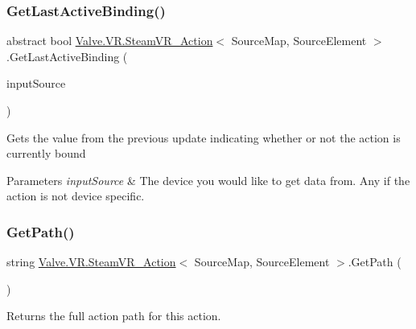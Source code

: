\subsubsection{\texorpdfstring{GetLastActiveBinding()}{GetLastActiveBinding()}\hspace{0.1cm}{\footnotesize\ttfamily [2/2]}}
{\footnotesize\ttfamily abstract bool \mbox{\hyperlink{class_valve_1_1_v_r_1_1_steam_v_r___action}{Valve.\+V\+R.\+Steam\+V\+R\+\_\+\+Action}}$<$ Source\+Map, Source\+Element $>$.Get\+Last\+Active\+Binding (\begin{DoxyParamCaption}\item[{\mbox{\hyperlink{namespace_valve_1_1_v_r_a82e5bf501cc3aa155444ee3f0662853f}{Steam\+V\+R\+\_\+\+Input\+\_\+\+Sources}}}]{input\+Source }\end{DoxyParamCaption})\hspace{0.3cm}{\ttfamily [pure virtual]}}



Gets the value from the previous update indicating whether or not the action is currently bound 


\begin{DoxyParams}{Parameters}
{\em input\+Source} & The device you would like to get data from. Any if the action is not device specific.\\
\hline
\end{DoxyParams}
\mbox{\label{class_valve_1_1_v_r_1_1_steam_v_r___action_aa6babacca9654f7d8184b281b99fa004}} 
\subsubsection{\texorpdfstring{GetPath()}{GetPath()}}
{\footnotesize\ttfamily string \mbox{\hyperlink{class_valve_1_1_v_r_1_1_steam_v_r___action}{Valve.\+V\+R.\+Steam\+V\+R\+\_\+\+Action}}$<$ Source\+Map, Source\+Element $>$.Get\+Path (\begin{DoxyParamCaption}{ }\end{DoxyParamCaption})}



Returns the full action path for this action. 



